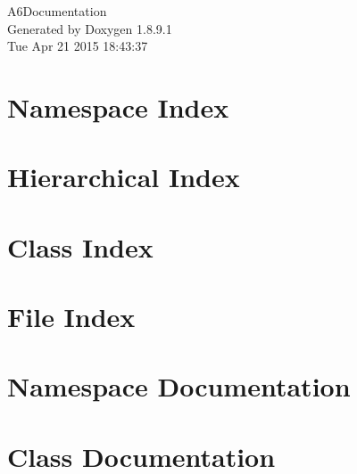 \documentclass[twoside]{book}
\newcommand{\+}{\discretionary{\mbox{\scriptsize$\hookleftarrow$}}{}{}}
\newcommand{\clearemptydoublepage}{%
  \newpage{\pagestyle{empty}\cleardoublepage}%
}
\begin{document}
\hypersetup{pageanchor=false,
             bookmarks=true,
             bookmarksnumbered=true,
             pdfencoding=unicode
            }
\begin{titlepage}
\vspace*{7cm}
\begin{center}%
{\Large A6\+Documentation }\\
\vspace*{1cm}
{\large Generated by Doxygen 1.8.9.1}\\
\vspace*{0.5cm}
{\small Tue Apr 21 2015 18:43:37}\\
\end{center}
\end{titlepage}
\clearemptydoublepage
\tableofcontents
\clearemptydoublepage
{}
\hypersetup{pageanchor=true}

\chapter{Namespace Index}

\chapter{Hierarchical Index}

\chapter{Class Index}

\chapter{File Index}

\chapter{Namespace Documentation}






\chapter{Class Documentation}






















\end{document}
